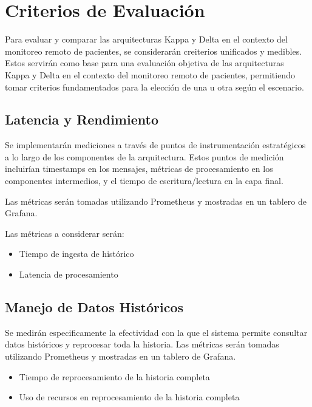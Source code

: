 \section{Criterios de Evaluación}

Para evaluar y comparar las arquitecturas Kappa y Delta en el contexto del monitoreo remoto de pacientes, se considerarán creiterios unificados y medibles.
Estos servirán como base para una evaluación objetiva de las arquitecturas Kappa y Delta en el contexto del monitoreo remoto de pacientes, permitiendo tomar criterios 
fundamentados para la elección de una u otra según el escenario.

\newpage

\subsection{Latencia y Rendimiento}

Se implementarán mediciones a través de puntos de instrumentación estratégicos a lo largo de los componentes de la arquitectura.  
Estos puntos de medición incluirían timestamps en los mensajes, métricas de procesamiento en los componentes intermedios, y el tiempo de escritura/lectura en la capa final. \newline

Las métricas serán tomadas utilizando Prometheus y mostradas en un tablero de Grafana.\newline

Las métricas a considerar serán:
\begin{itemize}
    \item Tiempo de ingesta de histórico
    \item Latencia de procesamiento
\end{itemize}

\subsection{Manejo de Datos Históricos}

Se medirán especificamente la efectividad con la que el sistema permite consultar datos históricos y reprocesar toda la historia.
Las métricas serán tomadas utilizando Prometheus y mostradas en un tablero de Grafana.

\begin{itemize}
    \item Tiempo de reprocesamiento de la historia completa
    \item Uso de recursos en reprocesamiento de la historia completa
\end{itemize}

